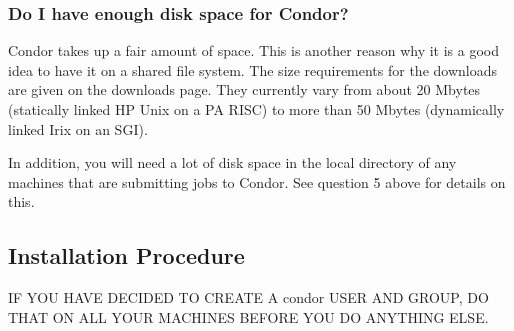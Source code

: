 \subsubsection{Do I have enough disk space for Condor?}

Condor takes up a fair amount of space.
This is another reason why it is a good idea to have it on a shared
file system.
The size requirements for the downloads are given on the
downloads page.
They currently vary from about 20 Mbytes (statically linked HP Unix
on a PA RISC)
to more than 50 Mbytes (dynamically linked Irix on an SGI).



In addition, you will need a lot of disk space in the local directory
of any machines that are submitting jobs to Condor.  See question 5
above for details on this.

\subsection{\label{sec:install-procedure}
Installation Procedure}

IF YOU HAVE DECIDED TO CREATE A condor USER AND GROUP, DO
THAT ON ALL YOUR MACHINES BEFORE YOU DO ANYTHING ELSE.


